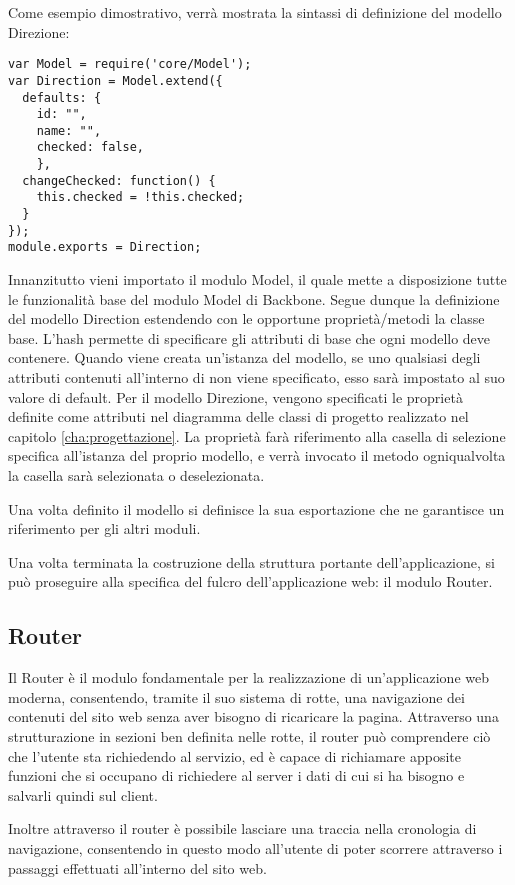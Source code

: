 Come esempio dimostrativo, verrà mostrata la sintassi di definizione del modello Direzione:
{\small
\begin{verbatim}
var Model = require('core/Model');
var Direction = Model.extend({
  defaults: {
    id: "",
    name: "",
    checked: false,
    },
  changeChecked: function() {
    this.checked = !this.checked;
  }
});
module.exports = Direction;
\end{verbatim}
}
Innanzitutto vieni importato il modulo Model, il quale mette a disposizione tutte le funzionalità base del modulo Model di Backbone.
Segue dunque la definizione del modello Direction estendendo con le opportune proprietà/metodi la classe base.
L'hash  permette di specificare gli attributi di base che ogni modello deve contenere. Quando viene creata un'istanza del modello, se uno qualsiasi degli attributi contenuti all'interno di  non viene specificato, esso sarà impostato al suo valore di default.
Per il modello Direzione, vengono specificati le proprietà definite come attributi nel diagramma delle classi di progetto realizzato nel capitolo \ref{cha:progettazione}. La proprietà  farà riferimento alla casella di selezione specifica all'istanza del proprio modello, e verrà invocato il metodo  ogniqualvolta la casella sarà selezionata o deselezionata.

Una volta definito il modello si definisce la sua esportazione che ne garantisce un riferimento per gli altri moduli.

Una volta terminata la costruzione della struttura portante dell'applicazione, si può proseguire alla specifica del fulcro dell'applicazione web: il modulo Router.

\subsection{Router} %
\label{sub:router}

Il Router è il modulo fondamentale per la realizzazione di un'applicazione web moderna, consentendo, tramite il suo sistema di rotte, una navigazione dei contenuti del sito web senza aver bisogno di ricaricare la pagina.
Attraverso una strutturazione in sezioni ben definita nelle rotte, il router può comprendere ciò che l'utente sta richiedendo al servizio, ed è capace di richiamare apposite funzioni che si occupano di richiedere al server i dati di cui si ha bisogno e salvarli quindi sul client.

Inoltre attraverso il router è possibile lasciare una traccia nella cronologia di navigazione, consentendo in questo modo all'utente di poter scorrere attraverso i passaggi effettuati all'interno del sito web.

